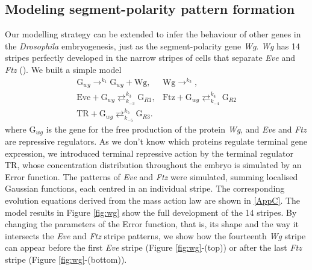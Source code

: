 \documentclass[final,authoryear, 5p, times]{elsarticle}
\begin{document}
\subsection{\textbf{Modeling segment-polarity pattern formation}}

Our modelling strategy can be extended to infer the behaviour of other genes in the \textit{Drosophila} embryogenesis, just as the segment-polarity gene \textit{Wg}. \textit{Wg} has 14 stripes perfectly developed in the narrow stripes of cells that separate \textit{Eve} and \textit{Ftz} (\cite{Ingham}). We built a simple model 
\begin{equation}\label{SPsystem}
    \begin{array}{ll}
        \displaystyle
        \text{G}_{wg} \mathop{\longrightarrow}^{k_{1}} \text{G}_{wg} + \text{Wg}, & \displaystyle
        \text{Wg} \mathop{\longrightarrow}^{k_{2}}, \\ \displaystyle
         \text{Eve} + \text{G}_{wg} \mathop{\rightleftarrows}^{k_{3}}_{k_{-3}} \text{G}_{R1},& \displaystyle
       \text{Ftz} + \text{G}_{wg} \mathop{\rightleftarrows}^{k_{4}}_{k_{-4}} \text{G}_{R2} \\ \displaystyle
        \text{TR} + \text{G}_{wg} \mathop{\rightleftarrows}^{k_{5}}_{k_{-5}} \text{G}_{R3}. &
    \end{array}
\end{equation}
where $\text{G}_{wg}$ is the gene  for the free production of the protein \textit{Wg}, and \textit{Eve} and \textit{Ftz} are repressive regulators. 
As we don't know which proteins regulate terminal gene expression, we introduced terminal repressive action by the terminal regulator TR, whose concentration distribution throughout the embryo is simulated by an Error function.
 The patterns of \textit{Eve} and \textit{Ftz} were simulated, summing localised Gaussian functions, each centred in an individual stripe.  The corresponding evolution equations derived from the mass action law are shown in \ref{AppC}. The model results in Figure \ref{fig:wg} show the full development of the 14 stripes. By changing the parameters of the Error function, that is, its shape and the way it intersects the \textit{Eve} and \textit{Ftz} stripe patterns, we show how the fourteenth \textit{Wg} stripe can appear before the first \textit{Eve} stripe (Figure \ref{fig:wg}-(top)) or after the last \textit{Ftz} stripe (Figure \ref{fig:wg}-(bottom)). 
\end{document}
